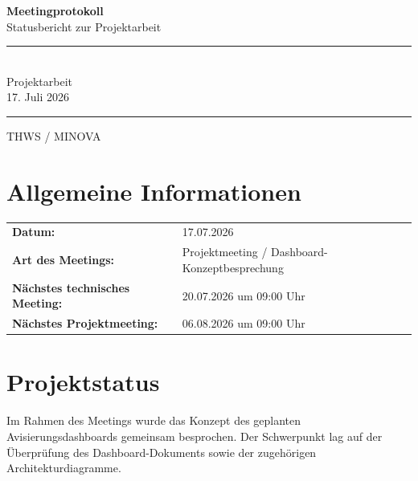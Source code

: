 \documentclass[a4paper,11pt]{article}
\begin{document}

\begin{titlepage}
    \centering

    \vspace*{3cm}

    {\Huge \textbf{Meetingprotokoll}}\\[0.5cm]
    {\Large Statusbericht zur Projektarbeit}\\[2cm]

    \rule{12cm}{0.5pt}\\[0.5cm]

    {\Large Projektarbeit}\\[0.3cm]
    {\large 17. Juli 2026}

    \rule{12cm}{0.5pt}

    \vfill

    {\large THWS / MINOVA}

\end{titlepage}


\tableofcontents
\newpage


\section{Allgemeine Informationen}

\begin{tabular}{ll}
\textbf{Datum:} & 17.07.2026 \\
\textbf{Art des Meetings:} & Projektmeeting / Dashboard-Konzeptbesprechung \\
\textbf{Nächstes technisches Meeting:} & 20.07.2026 um 09:00 Uhr \\
\textbf{Nächstes Projektmeeting:} & 06.08.2026 um 09:00 Uhr \\
\end{tabular}

\vspace{1cm}

\section{Projektstatus}

Im Rahmen des Meetings wurde das Konzept des geplanten Avisierungsdashboards gemeinsam besprochen. Der Schwerpunkt lag auf der Überprüfung des Dashboard-Dokuments sowie der zugehörigen Architekturdiagramme.
\end{document}
